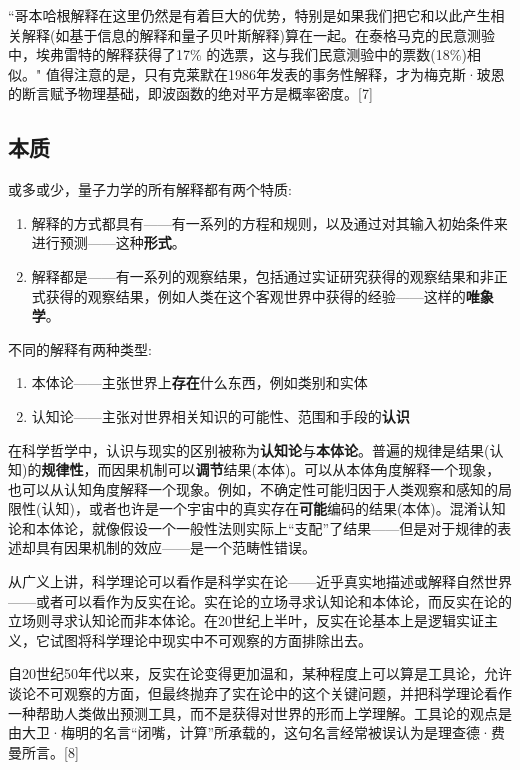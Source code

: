 “哥本哈根解释在这里仍然是有着巨大的优势，特别是如果我们把它和以此产生相关解释(如基于信息的解释和量子贝叶斯解释)算在一起。在泰格马克的民意测验中，埃弗雷特的解释获得了17\% 的选票，这与我们民意测验中的票数(18\%)相似。"
值得注意的是，只有克莱默在1986年发表的事务性解释，才为梅克斯·玻恩的断言赋予物理基础，即波函数的绝对平方是概率密度。[7]

\subsection{本质}

或多或少，量子力学的所有解释都有两个特质:

\begin{enumerate}
\item  解释的方式都具有——有一系列的方程和规则，以及通过对其输入初始条件来进行预测——这种\textbf{形式}。
\item 解释都是——有一系列的观察结果，包括通过实证研究获得的观察结果和非正式获得的观察结果，例如人类在这个客观世界中获得的经验——这样的\textbf{唯象学}。
\end{enumerate}

不同的解释有两种类型:

\begin{enumerate}
\item 本体论——主张世界上\textbf{存在}什么东西，例如类别和实体
\item 认知论——主张对世界相关知识的可能性、范围和手段的\textbf{认识}
\end{enumerate}

在科学哲学中，认识与现实的区别被称为\textbf{认知论}与\textbf{本体论}。普遍的规律是结果(认知)的\textbf{规律性}，而因果机制可以\textbf{调节}结果(本体)。可以从本体角度解释一个现象，也可以从认知角度解释一个现象。例如，不确定性可能归因于人类观察和感知的局限性(认知)，或者也许是一个宇宙中的真实存在\textbf{可能}编码的结果(本体)。混淆认知论和本体论，就像假设一个一般性法则实际上“支配”了结果——但是对于规律的表述却具有因果机制的效应——是一个范畴性错误。

从广义上讲，科学理论可以看作是科学实在论——近乎真实地描述或解释自然世界——或者可以看作为反实在论。实在论的立场寻求认知论和本体论，而反实在论的立场则寻求认知论而非本体论。在20世纪上半叶，反实在论基本上是逻辑实证主义，它试图将科学理论中现实中不可观察的方面排除出去。

自20世纪50年代以来，反实在论变得更加温和，某种程度上可以算是工具论，允许谈论不可观察的方面，但最终抛弃了实在论中的这个关键问题，并把科学理论看作一种帮助人类做出预测工具，而不是获得对世界的形而上学理解。工具论的观点是由大卫·梅明的名言“闭嘴，计算”所承载的，这句名言经常被误认为是理查德·费曼所言。[8]

